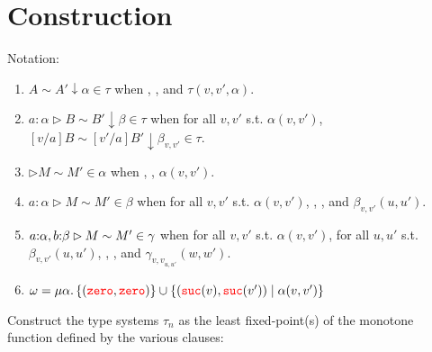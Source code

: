 \newcommand{\sameType}[4]{\ensuremath{#1 \sim #2 \downarrow #3 \in #4}}
\newcommand{\sameTypeOne}[6]{\ensuremath{\isOf{#1}{#2} \rhd #3 \sim #4 \downarrow #5 \in #6}}
\newcommand{\sameComp}[4]{\ensuremath{#1 \rhd #2 \sim #3 \in #4}}
\newcommand{\equivComp}[3]{\ensuremath{#1 \RHD #2 \asymp #3}}
\newcommand{\CComp}[4]{\ensuremath{\diamond #1 \rhd #2 \in #3 \diamond #4}}
\newcommand{\CCompOne}[6]
{\ensuremath{\isOf{#1}{#2} \diamond #3  \rhd #4 \in #5 \diamond #6}}

\newcommand{\type}[1]{\mathtt{Type}_{#1}}
\newcommand{\term}{\mathsf{Term}}
\newcommand{\evalTo}[1]{{#1}^{\Downarrow}}
\newcommand{\class}[1]{\ensuremath{[#1]}}
\newcommand{\cost}[1]{\ensuremath{\mathcal{C}}(#1)}
\newcommand{\fequiv}[2]{\ensuremath{#1 \asymp #2}}
\newcommand{\arrabt}[3]{\ensuremath{\Pi(#1; #2; #3)}}
\newcommand{\relpot}[4]{\ensuremath{\mathtt{relpot}(#1.#2; #3.#4)}}
\newcommand{\relpotty}[3]{\ensuremath{\mathtt{relpotty}(#1;#2.#3)}}
\section{Construction}

Notation:

\begin{enumerate}
  \item $A \sim A' \downarrow \alpha \in \tau$ when , , and 
  $\tau(v,v',\alpha)$.
  \item $a : \alpha \rhd B \sim B' \downarrow \beta \in \tau$ when 
  for all $v,v'$ s.t. $\alpha(v,v')$, \sameType{[v/a]B}{[v'/a]B'}{\beta_{v,v'}}{\tau}.
\item \sameComp{}{M}{M'}{\alpha} when , , $\alpha(v,v')$.
  \item $a : \alpha \rhd M \sim M' \in \beta$ when 
  for all $v,v'$ s.t. $\alpha(v,v')$, 
  , , and $\beta_{v,v'}(u,u')$.
\item \sameComp{\isOf{a}{\alpha}, \isOf{b}{\beta}}{M}{M'}{\gamma} when 
  for all $v,v'$ s.t. $\alpha(v,v')$, 
  for all $u,u'$ s.t. $\beta_{v,v'}(u,u')$, 
  , , and $\gamma_{{v,v}_{u,u'}}(w,w')$.
  \item $\omega = \mu \alpha.\, \{({\color{red}{\mathtt{zero}}},{\color{red}{\mathtt{zero}}})\} \cup \{({\color{red}{\mathtt{suc}}}(v),{\color{red}{\mathtt{suc}}}(v')) \mid \alpha(v,v')\}$
\end{enumerate}

Construct the type systems $\tau_n$ as the least fixed-point(s) of the 
monotone function defined by the various clauses: 


